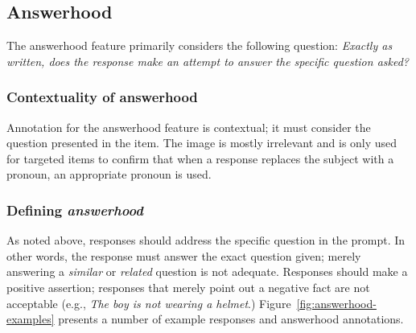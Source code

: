 \documentclass[12pt,notitlepage]{article}
\begin{document}
\subsection{Answerhood} \label{subsec:answerhood}

The answerhood feature primarily considers the following question: \textit{Exactly as written, does the response make an attempt to answer the specific question asked?}

\subsubsection{Contextuality of answerhood} Annotation for the answerhood feature is contextual; it must consider the question presented in the item. The image is mostly irrelevant and is only used for targeted items to confirm that when a response replaces the subject with a pronoun, an appropriate pronoun is used.

\subsubsection{Defining \textit{answerhood}} As noted above, responses should address the specific question in the prompt. In other words, the response must answer the exact question given; merely answering a \textit{similar} or \textit{related} question is not adequate. Responses should make a positive assertion; responses that merely point out a negative fact are not acceptable (e.g., \textit{The boy is not wearing a helmet}.) Figure~\ref{fig:answerhood-examples} presents a number of example responses and answerhood annotations. 
\end{document}
